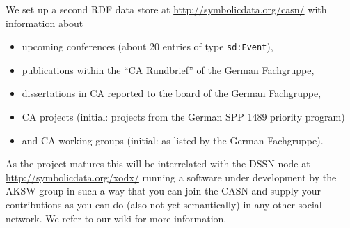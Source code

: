 \documentclass{llncs}
\begin{document}
We set up a second RDF data store at \url{http://symbolicdata.org/casn/} with
information about 
\begin{itemize}
\item upcoming conferences (about 20 entries of type \texttt{sd:Event}), 
\item publications within the ``CA Rundbrief'' of the German Fachgruppe, 
\item dissertations in CA reported to the board of the German Fachgruppe, 
\item CA projects (initial: projects from the German SPP 1489 priority
  program) 
\item and CA working groups (initial: as listed by the German Fachgruppe). 
\end{itemize}
As the project matures this will be interrelated with the DSSN node at
\url{http://symbolicdata.org/xodx/} running a software under development by
the AKSW group in such a way that you can join the CASN and supply your
contributions as you can do (also not yet semantically) in any other social
network.  We refer to our wiki \cite{sdwiki} for more information.
\end{document}
